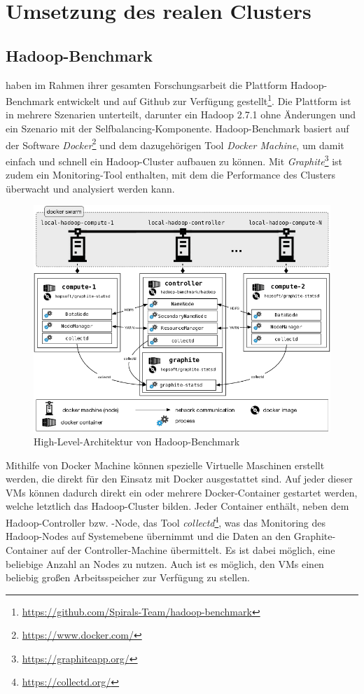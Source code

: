 \section{Umsetzung des realen Clusters}\label{sec:aufbauCluster}

\subsection{Hadoop-Benchmark}\label{sec:hadoopBenchmark}

\citeauthor{zhang2016} haben im Rahmen ihrer gesamten Forschungsarbeit die Plattform Hadoop-Benchmark entwickelt und auf Github zur Verfügung gestellt\footnote{\url{https://github.com/Spirals-Team/hadoop-benchmark}}. Die Plattform ist in mehrere Szenarien unterteilt, darunter ein Hadoop 2.7.1 ohne Änderungen und ein Szenario mit der Selfbalancing-Komponente. Hadoop-Benchmark basiert auf der Software \emph{Docker}\footnote{\url{https://www.docker.com/}} und dem dazugehörigen Tool \emph{Docker Machine}, um damit einfach und schnell ein Hadoop-Cluster aufbauen zu können. Mit \emph{Graphite}\footnote{\url{https://graphiteapp.org/}} ist zudem ein Monitoring-Tool enthalten, mit dem die Performance des Clusters überwacht und analysiert werden kann.

\begin{figure}
    \centering
    \includegraphics[width=.8\columnwidth]{./images/hadoopBenchmarkArch.png}
    \caption[High-Level-Architektur von Hadoop-Benchmark]{High-Level-Architektur von Hadoop-Benchmark \cite{abb:hadoopBenchmarkArch}}
    \label{fig:hadoopBenchmarkArchitecture}
\end{figure}

Mithilfe von Docker Machine können spezielle Virtuelle Maschinen erstellt werden, die direkt für den Einsatz mit Docker ausgestattet sind. Auf jeder dieser VMs können dadurch direkt ein oder mehrere Docker-Container gestartet werden, welche letztlich das Hadoop-Cluster bilden. Jeder Container enthält, neben dem Hadoop-Controller bzw. -Node, das Tool \emph{collectd}\footnote{\url{https://collectd.org/}}, was das Monitoring des Hadoop-Nodes auf Systemebene übernimmt und die Daten an den Graphite-Container auf der Controller-Machine übermittelt. Es ist dabei möglich, eine beliebige Anzahl an Nodes zu nutzen. Auch ist es möglich, den VMs einen beliebig großen Arbeitsspeicher zur Verfügung zu stellen.

